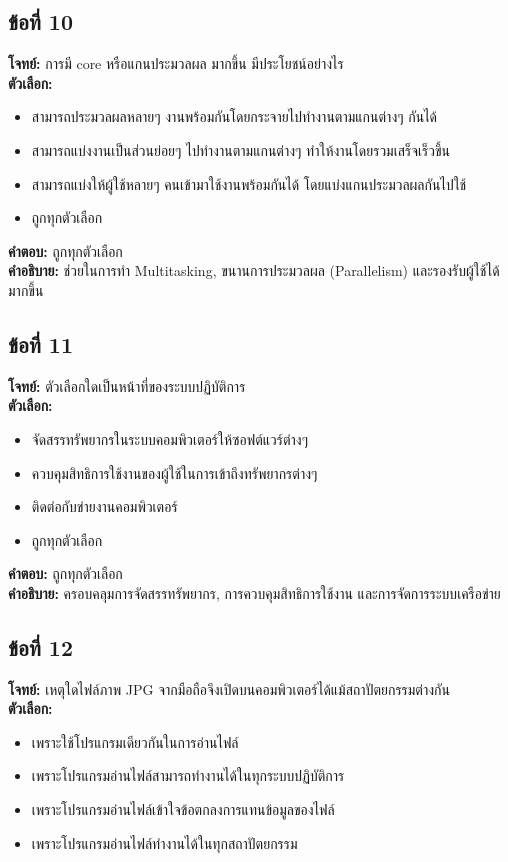 \documentclass[12pt]{article}
\begin{document}
\subsection*{ข้อที่ 10}
\textbf{โจทย์:} การมี core หรือแกนประมวลผล มากขึ้น มีประโยชน์อย่างไร\\
\textbf{ตัวเลือก:}
\begin{itemize}
    \item สามารถประมวลผลหลายๆ งานพร้อมกันโดยกระจายไปทำงานตามแกนต่างๆ กันได้
    \item สามารถแบ่งงานเป็นส่วนย่อยๆ ไปทำงานตามแกนต่างๆ ทำให้งานโดยรวมเสร็จเร็วขึ้น
    \item สามารถแบ่งให้ผู้ใช้หลายๆ คนเข้ามาใช้งานพร้อมกันได้ โดยแบ่งแกนประมวลผลกันไปใช้
    \item ถูกทุกตัวเลือก
\end{itemize}

\textbf{คำตอบ:} ถูกทุกตัวเลือก\\
\textbf{คำอธิบาย:} ช่วยในการทำ Multitasking, ขนานการประมวลผล (Parallelism) และรองรับผู้ใช้ได้มากขึ้น

\subsection*{ข้อที่ 11}
\textbf{โจทย์:} ตัวเลือกใดเป็นหน้าที่ของระบบปฏิบัติการ\\
\textbf{ตัวเลือก:}
\begin{itemize}
    \item จัดสรรทรัพยากรในระบบคอมพิวเตอร์ให้ซอฟต์แวร์ต่างๆ
    \item ควบคุมสิทธิการใช้งานของผู้ใช้ในการเข้าถึงทรัพยากรต่างๆ
    \item ติดต่อกับข่ายงานคอมพิวเตอร์
    \item ถูกทุกตัวเลือก
\end{itemize}

\textbf{คำตอบ:} ถูกทุกตัวเลือก\\
\textbf{คำอธิบาย:} ครอบคลุมการจัดสรรทรัพยากร, การควบคุมสิทธิการใช้งาน และการจัดการระบบเครือข่าย

\subsection*{ข้อที่ 12}
\textbf{โจทย์:} เหตุใดไฟล์ภาพ JPG จากมือถือจึงเปิดบนคอมพิวเตอร์ได้แม้สถาปัตยกรรมต่างกัน\\
\textbf{ตัวเลือก:}
\begin{itemize}
    \item เพราะใช้โปรแกรมเดียวกันในการอ่านไฟล์
    \item เพราะโปรแกรมอ่านไฟล์สามารถทำงานได้ในทุกระบบปฏิบัติการ
    \item เพราะโปรแกรมอ่านไฟล์เข้าใจข้อตกลงการแทนข้อมูลของไฟล์
    \item เพราะโปรแกรมอ่านไฟล์ทำงานได้ในทุกสถาปัตยกรรม
\end{itemize}
\end{document}
